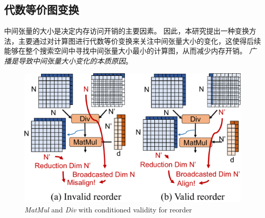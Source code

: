 \subsection{代数等价图变换}
中间张量的大小是决定内存访问开销的主要因素。
因此，本研究提出一种变换方法，主要通过对计算图进行代数等价变换来关注中间张量大小的变化，这使得后续能够在整个搜索空间中寻找中间张量大小最小的计算图，从而减少内存开销。
\textit{广播是导致中间张量大小变化的本质原因}。

\begin{figure}[h]
    \centering
    \includegraphics[width=\linewidth]{figures/flashtensor/wo_broadcast-crop.pdf}
    \caption{\textit{MatMul} and \textit{Div} with conditioned validity for reorder}
    \label{fig:wo_broadcast}
\end{figure}

